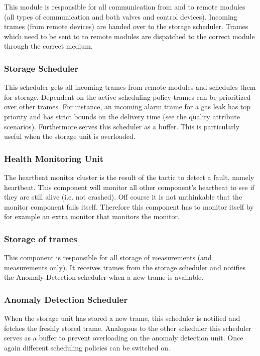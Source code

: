 \npar This module is responsible for all communication from and to remote
modules (all types of communication and both valves and control devices).
Incoming trames (from remote devices) are handed over to the storage scheduler.
Trames which need to be sent to to remote modules are dispatched to the correct
module through the correct medium.

\subsubsection{Storage Scheduler}

\npar This scheduler gets all incoming trames from remote modules and schedules
them for storage. Dependent on the active scheduling policy trames can be
prioritized over other trames. For instance, an incoming alarm trame for a gas
leak has top priority and has strict bounds on the delivery time (see the
quality attribute scenarios). Furthermore serves this scheduler as a buffer.
This is particularly useful when the storage unit is overloaded.

\subsubsection{Health Monitoring Unit}

\npar The heartbeat monitor cluster is the result of the tactic to detect a
fault, namely heartbeat. This component will monitor all other component's
heartbeat to see if they are still alive (i.e. not crashed). Off course it is
not unthinkable that the monitor component fails itself. Therefore this
component has to monitor itself by for example an extra monitor that monitors
the monitor.

\subsubsection{Storage of trames}

\npar This component is responsible for all storage of measurements (and
measurements only). It receives trames from the storage scheduler and notifies
the Anomaly Detection scheduler when a new trame is available.

\subsubsection{Anomaly Detection Scheduler}

\npar When the storage unit has stored a new trame, this scheduler is notified
and fetches the freshly stored trame. Analogous to the other scheduler this
scheduler serves as a buffer to prevent overloading on the anomaly detection
unit. Once again different scheduling policies can be switched on.

